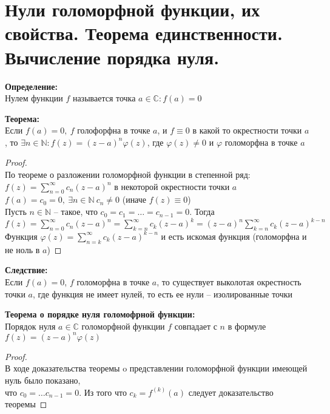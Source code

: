 \newpage
\section{Нули голоморфной функции, их свойства. Теорема единственности. Вычисление порядка нуля.}

\textbf{Определение:}\\[2mm]
Нулем функции $f$ называется точка $a \in \mathbb{C}: f(a) = 0$


\textbf{Теорема:}\\[2mm]
Если $f(a) = 0, \ f$ голофорфна в точке $a$, и $f \equiv 0$ в какой то окрестности точки $a$,
то $\exists n \in \mathbb{N}: f(z) = (z - a)^n\varphi(z)$, где $\varphi(z) \neq 0$ и $\varphi$ голоморфна в точке $a$


\begin{proof}
    \ \\
    По теореме о разложении голоморфной функции в степенной ряд:\\[2mm]
    $f(z) = \sum_{n=0}^{\infty} c_n (z-a)^n$ в некоторой окрестности точки $a$\\[2mm]
    $f(a) = c_0 = 0, \ \exists n \in \mathbb{N} \ c_n \neq 0$ (иначе $f(z) \equiv 0$)\\[2mm]
    Пусть $n \in \mathbb{N}$ -- такое, что $c_0 = c_1 = \ldots = c_{n-1} = 0$. Тогда \\[2mm]
    $f(z) = \sum_{n=0}^{\infty}c_n (z-a)^n = \sum_{k=n}^{\infty}c_k(z-a)^k = (z-a)^n\sum_{k=n}^{\infty}c_k(z-a)^{k-n}$\\[2mm]
    Функция $\varphi(z) = \sum_{n=k}^{\infty}c_k(z-a)^{k-n}$ и есть искомая функция (голоморфна и не ноль в $a$)
\end{proof}


\textbf{Следствие:}\\[2mm]
Если $f(a) = 0$, $f$ голоморфна в точке $a$, то
существует выколотая окрестность точки $a$, где функция не имеет нулей,
то есть ее нули -- изолированные точки


\textbf{Теорема о порядке нуля голомофрной функции:}\\[2mm]
Порядок нуля $a \in \mathbb{C}$ голоморфной функции $f$ 
совпадает с $n$ в формуле $f(z) = (z-a)^n\varphi(z)$


\begin{proof}
    \ \\
    В ходе доказательства теоремы o представлении
    голоморфной функции имеющей нуль было показано,\\[2mm] 
    что $c_0 = \ldots c_{n-1} = 0$. Из того что $c_k = f^{(k)}(a)$ 
    следует доказательство теоремы
\end{proof}


